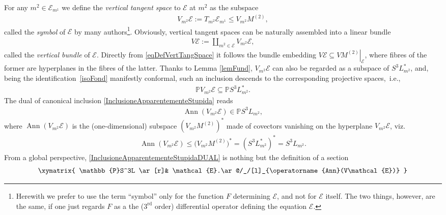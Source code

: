 \documentclass[pdftex]{sigma}
\newcommand{\E}{\mathcal{E}}
\newcommand{\Ann}{\operatorname{Ann}}
\renewcommand{\P}{\mathbb{P}}
\newcommand{\Rd}{^\textrm{rd}}
\numberwithin{equation}{section}
\begin{document}
For any $m^2\in \E_{m^1}$ we def\/ine the \emph{vertical tangent space} to $\E$ at $m^2$ as the subspace
\begin{gather}\label{eqDefVertTangSpace}
V_{m^2}\E:=T_{m^2}\E_{m^1}\leq V_{m^2}M^{(2)},
\end{gather}
called the \emph{symbol} of $\E$ by many authors\footnote{Herewith we prefer to use the term ``symbol'' only for the function $F$ determining $\E$, and not for $\E$ itself. The two things, however, are the same, if one just regards $F$ as a the ($3\Rd$ order) dif\/ferential operator def\/ining the equation $\E$.}. Obviously, vertical tangent spaces can be naturally assembled into a linear bundle
\begin{gather*}%
V\E:=\coprod_{m^2\in \E}V_{m^2}\E,
\end{gather*}
called  the \emph{vertical bundle} of $\E$. Directly from \eqref{eqDefVertTangSpace} it follows the bundle embedding $V\E\subseteq \left.VM^{(2)}\right|_\E$,
where f\/ibres of the former are hyperplanes in the f\/ibres of the latter. Thanks to Lemma \ref{lemFund}, $V_{m^2}\E$ can also be regarded as a subspace of $S^3L_{m^2}^\ast$, and, being the identif\/ica\-tion~\eqref{isoFond} manifestly conformal, such an inclusion descends to the corresponding projective spaces,~i.e.,
\begin{gather}\label{InclusioneApparentementeStupida}
\P V_{m^2}\E \subseteq \P S^3L_{m^2}^\ast.
\end{gather}
The dual of canonical inclusion \eqref{InclusioneApparentementeStupida} reads
\begin{gather}\label{InclusioneApparentementeStupidaDUAL}
\Ann(V_{m^2}\E ) \in \P S^3L_{m^2},
\end{gather}
where $\Ann(V_{m^2}\E )$ is the (one-dimensional) subspace $\left(V_{m^2}M^{(2)}\right)^*$ made of covectors vanishing on the hyperplane $V_{m^2}\E $, viz.
\begin{gather}\label{eqComeSiDEfinisceIlSimbolo}
\Ann(V_{m^2}\E )\leq \big(V_{m^2}M^{(2)}\big)^*=(S^3L_{m^2}^\ast)^\ast=S^3L_{m^2}.
\end{gather}
From a global perspective, \eqref{InclusioneApparentementeStupidaDUAL} is nothing but the def\/inition of a section
\begin{gather}\label{secSymE}
\xymatrix{
\P S^3L \ar[r]& \E.\ar@/_/[l]_{\Ann(V\E )}
}
\end{gather}
\end{document}
